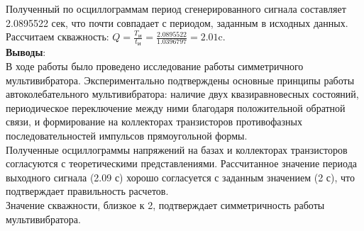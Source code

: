 Полученный по осциллограммам период
сгенерированного сигнала составляет 2.0895522 сек, что почти совпадает с периодом, заданным в исходных данных.\\
Рассчитаем скважность: $Q=\frac{T_\text{И}}{t_\text{И}}=\frac{2.0895522}{1.0396797}=2.01$c.\\


\textbf{Выводы}:\\
В ходе работы было проведено исследование работы симметричного мультивибратора.
Экспериментально подтверждены основные принципы работы автоколебательного мультивибратора:
наличие двух квазиравновесных состояний, периодическое переключение между ними благодаря положительной
обратной связи, и формирование на коллекторах транзисторов противофазных последовательностей импульсов
прямоугольной формы.\\

Полученные осциллограммы напряжений на базах и коллекторах транзисторов согласуются с теоретическими
представлениями. Рассчитанное значение периода выходного сигнала (2.09 с) хорошо согласуется с
заданным значением (2 с), что подтверждает правильность расчетов.\\

Значение скважности, близкое к 2, подтверждает симметричность работы мультивибратора.

